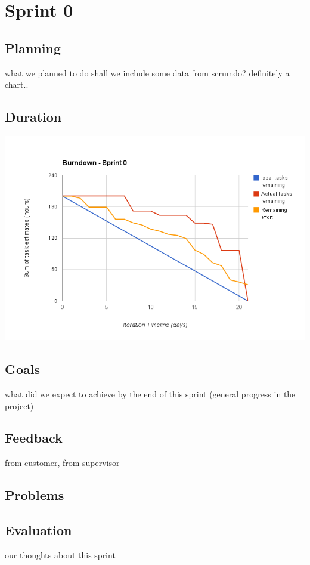
\chapter{Sprint 0} %

\label{Sprint 0} %


\section{Planning}



what we planned to do
shall we include some data from scrumdo? definitely a chart..
\section{Duration}
\includegraphics[scale=0.6]{./Figures/burndownSprint0.png}
\section{Goals}
what did we expect to achieve by the end of this sprint (general progress in the project)
\section{Feedback}
from customer, from supervisor
\section{Problems}
\section{Evaluation}
our thoughts about this sprint
